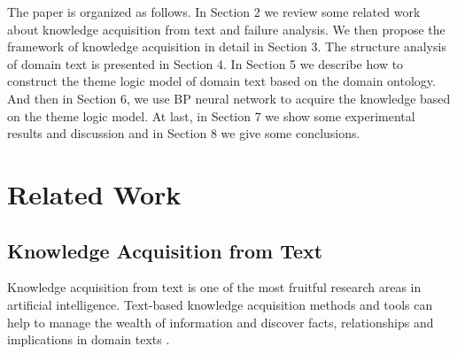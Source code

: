 \documentclass{elsarticle}
\begin{document}
The paper is organized as follows. In Section 2 we review some related work about knowledge acquisition from text and failure analysis. We then propose the framework of knowledge acquisition in detail in Section 3. The structure analysis of domain text is presented in Section 4. In Section 5 we describe how to construct the theme logic model of domain text based on the domain ontology. And then in Section 6, we use BP neural network to acquire the knowledge based on the theme logic model. At last, in Section 7 we show some experimental results and discussion and in Section 8 we give some conclusions. 

\section{Related Work
}
\label{sec:related-work}

\subsection{Knowledge Acquisition from Text
}
\label{sec:knowl-acqu-from}

Knowledge acquisition from text is one of the most fruitful research
areas in artificial intelligence. Text-based knowledge acquisition
methods and tools can help to manage the wealth of information and
discover facts, relationships and implications in domain texts
\cite{Hahn2000,Gunn1999}. 
\end{document}

